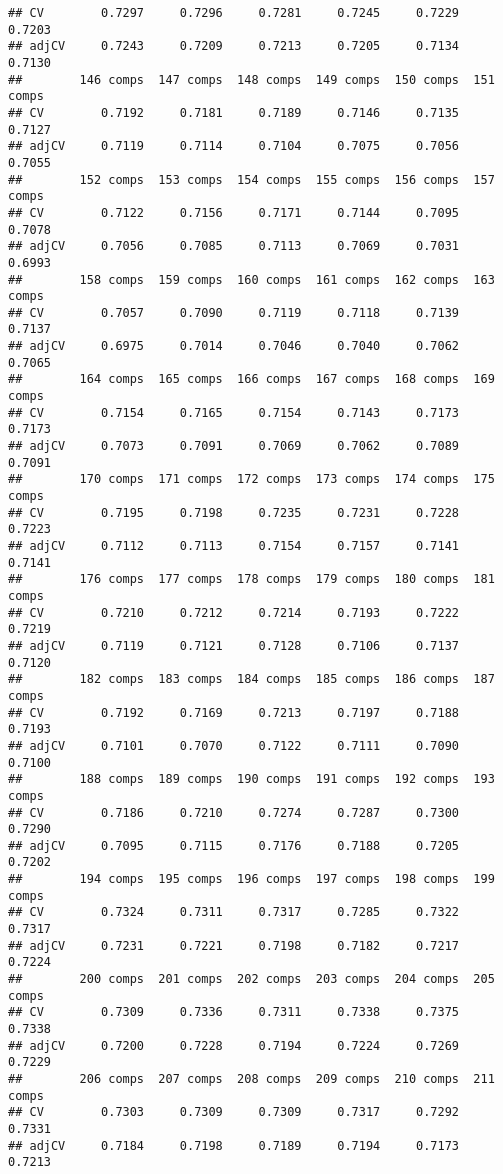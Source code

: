 \documentclass[]{article}
\begin{document}
\begin{verbatim}
## CV        0.7297     0.7296     0.7281     0.7245     0.7229     0.7203
## adjCV     0.7243     0.7209     0.7213     0.7205     0.7134     0.7130
##        146 comps  147 comps  148 comps  149 comps  150 comps  151 comps
## CV        0.7192     0.7181     0.7189     0.7146     0.7135     0.7127
## adjCV     0.7119     0.7114     0.7104     0.7075     0.7056     0.7055
##        152 comps  153 comps  154 comps  155 comps  156 comps  157 comps
## CV        0.7122     0.7156     0.7171     0.7144     0.7095     0.7078
## adjCV     0.7056     0.7085     0.7113     0.7069     0.7031     0.6993
##        158 comps  159 comps  160 comps  161 comps  162 comps  163 comps
## CV        0.7057     0.7090     0.7119     0.7118     0.7139     0.7137
## adjCV     0.6975     0.7014     0.7046     0.7040     0.7062     0.7065
##        164 comps  165 comps  166 comps  167 comps  168 comps  169 comps
## CV        0.7154     0.7165     0.7154     0.7143     0.7173     0.7173
## adjCV     0.7073     0.7091     0.7069     0.7062     0.7089     0.7091
##        170 comps  171 comps  172 comps  173 comps  174 comps  175 comps
## CV        0.7195     0.7198     0.7235     0.7231     0.7228     0.7223
## adjCV     0.7112     0.7113     0.7154     0.7157     0.7141     0.7141
##        176 comps  177 comps  178 comps  179 comps  180 comps  181 comps
## CV        0.7210     0.7212     0.7214     0.7193     0.7222     0.7219
## adjCV     0.7119     0.7121     0.7128     0.7106     0.7137     0.7120
##        182 comps  183 comps  184 comps  185 comps  186 comps  187 comps
## CV        0.7192     0.7169     0.7213     0.7197     0.7188     0.7193
## adjCV     0.7101     0.7070     0.7122     0.7111     0.7090     0.7100
##        188 comps  189 comps  190 comps  191 comps  192 comps  193 comps
## CV        0.7186     0.7210     0.7274     0.7287     0.7300     0.7290
## adjCV     0.7095     0.7115     0.7176     0.7188     0.7205     0.7202
##        194 comps  195 comps  196 comps  197 comps  198 comps  199 comps
## CV        0.7324     0.7311     0.7317     0.7285     0.7322     0.7317
## adjCV     0.7231     0.7221     0.7198     0.7182     0.7217     0.7224
##        200 comps  201 comps  202 comps  203 comps  204 comps  205 comps
## CV        0.7309     0.7336     0.7311     0.7338     0.7375     0.7338
## adjCV     0.7200     0.7228     0.7194     0.7224     0.7269     0.7229
##        206 comps  207 comps  208 comps  209 comps  210 comps  211 comps
## CV        0.7303     0.7309     0.7309     0.7317     0.7292     0.7331
## adjCV     0.7184     0.7198     0.7189     0.7194     0.7173     0.7213

\end{verbatim}
\end{document}
